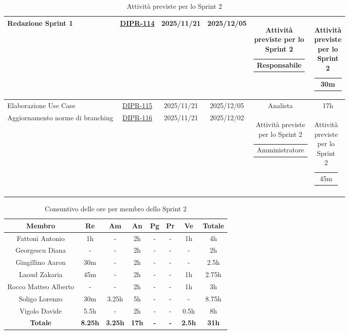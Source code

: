 \documentclass[a4paper,12pt]{article}
\begin{document}
\begin{spacing}{1}
\begin{longtable}{|p{4cm}|c|c|c|c|c|}
            \hline
            Redazione Sprint 1 & \href{https://7zpus.atlassian.net/browse/DIPR-114}{DIPR-114} & 2025/11/21 & 2025/12/05 & \begin{tabular}[c]{@{}c@{}} Responsabile \end{tabular} & \begin{tabular}[c]{@{}c@{}} 30m \end{tabular} \\
            \hline
            Elaborazione Use Case & \href{https://7zpus.atlassian.net/browse/DIPR-115}{DIPR-115} & 2025/11/21 & 2025/12/05 & Analista & 17h \\
            \hline
            Aggiornamento norme di branching & \href{https://7zpus.atlassian.net/browse/DIPR-116}{DIPR-116} & 2025/11/21 & 2025/12/02 & \begin{tabular}[c]{@{}c@{}} Amministratore \end{tabular} & \begin{tabular}[c]{@{}c@{}} 45m \end{tabular} \\ %
            \hline
            \caption{Attività previste per lo Sprint 2}
        \end{longtable}
    \end{spacing}


\begin{table}[H]
    \begin{adjustwidth}{-4cm}{-4cm}
    \centering
    \begin{tabular}{|c|c|c|c|c|c|c|c|}
        \hline
        \textbf{Membro}& \textbf{Re} & \textbf{Am} & \textbf{An} & \textbf{Pg} & \textbf{Pr} & \textbf{Ve} & \textbf{Totale} \\
        \hline
        Fattoni Antonio & 1h & - & 2h & - & - & 1h & 4h \\
        \hline
        Georgescu Diana& - & - & 2h & - & - & - & 2h \\
        \hline
        Gingillino Aaron& 30m & - & 2h & - & - & - & 2.5h \\
        \hline
        Laoud Zakaria& 45m & - & 2h & - & - & 1h & 2.75h \\
        \hline
        Rocco Matteo Alberto & - & - & 2h & - & - & 1h & 3h \\
        \hline
        Soligo Lorenzo& 30m & 3.25h & 5h & - & - & - & 8.75h \\
        \hline
        Vigolo Davide & 5.5h & - & 2h & - & - & 0.5h & 8h \\
        \hline
        \textbf{Totale} & \textbf{8.25h}& \textbf{3.25h} & \textbf{17h}& \textbf{-}& \textbf{-}& \textbf{2.5h}& \textbf{31h}\\
        \hline
    \end{tabular}
    \caption{Consuntivo delle ore per membro dello Sprint 2}
    \end{adjustwidth}
\end{table}
\end{document}
